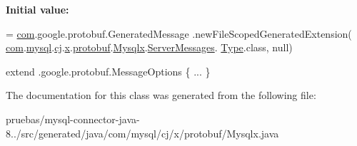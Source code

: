 {\bfseries Initial value\+:}
\begin{DoxyCode}
= \mbox{\hyperlink{namespacecom}{com}}.google.protobuf.GeneratedMessage
          .newFileScopedGeneratedExtension(
        \mbox{\hyperlink{namespacecom}{com}}.\mbox{\hyperlink{namespacecom_1_1mysql}{mysql}}.\mbox{\hyperlink{namespacecom_1_1mysql_1_1cj}{cj}}.\mbox{\hyperlink{namespacecom_1_1mysql_1_1cj_1_1x}{x}}.\mbox{\hyperlink{namespacecom_1_1mysql_1_1cj_1_1x_1_1protobuf}{protobuf}}.\mbox{\hyperlink{classcom_1_1mysql_1_1cj_1_1x_1_1protobuf_1_1_mysqlx}{Mysqlx}}.\mbox{\hyperlink{classcom_1_1mysql_1_1cj_1_1x_1_1protobuf_1_1_mysqlx_1_1_server_messages}{ServerMessages}}.
      \mbox{\hyperlink{enumcom_1_1mysql_1_1cj_1_1x_1_1protobuf_1_1_mysqlx_1_1_server_messages_1_1_type}{Type}}.class,
        null)
\end{DoxyCode}
{\ttfamily extend .google.\+protobuf.\+Message\+Options \{ ... \}} 

The documentation for this class was generated from the following file\+:\begin{DoxyCompactItemize}
\item 
pruebas/mysql-\/connector-\/java-\/8../src/generated/java/com/mysql/cj/x/protobuf/Mysqlx.\+java\end{DoxyCompactItemize}
